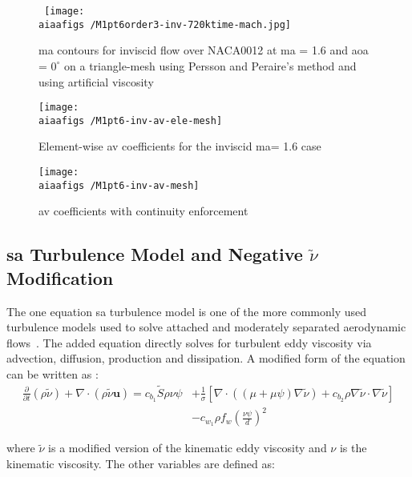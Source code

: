 \begin{figure}[h] \tt
\centering
\texttt{[image: \\aiaafigs /M1pt6order3-inv-720ktime-mach.jpg]} \\
\caption{\gls{ma} contours for inviscid flow over NACA0012 at \gls{ma} = 1.6 and \gls{aoa} = $0^{\circ} $ on a triangle-mesh using Persson and Peraire's method and using artificial viscosity}
\label{fig:inv_mach}
\end{figure}

\begin{figure}
\centering
\begin{minipage}[t]{.55\textwidth}
  \centering
  \texttt{[image: \\aiaafigs /M1pt6-inv-av-ele-mesh]}
  \caption{Element-wise \gls{av} coefficients for the inviscid \gls{ma}= 1.6 case}
  \label{fig:AV-ele}
\end{minipage}%
\begin{minipage}[t]{.55\textwidth}
  \centering
  \texttt{[image: \\aiaafigs /M1pt6-inv-av-mesh]}
  \caption{\gls{av} coefficients with continuity enforcement}
  \label{fig:AV-cont}
\end{minipage}
\end{figure} 

\subsection{\gls{sa} Turbulence Model and Negative $\tilde\nu$ Modification}

The one equation \gls{sa} turbulence model is one of the more commonly used turbulence models used to solve attached and moderately separated aerodynamic flows~\cite{spalart1992one}. The added equation directly solves for turbulent eddy viscosity via advection, diffusion, production and dissipation. A modified form of the equation can be written as \cite{burgess2012robust,oliver2008high,moro2011navier}:
\begin{equation}
\begin{split}
	\frac{\partial}{\partial t}(\rho\tilde\nu) + \nabla\cdot(\rho\tilde\nu\boldsymbol{u}) = c_{b_1}\tilde S \rho\nu\psi &+ \frac{1}{\sigma}\left[\nabla\cdot((\mu + \mu\psi)\nabla\tilde\nu) + c_{b_2}\rho\nabla\tilde\nu\cdot\nabla\tilde\nu\right] \\&- c_{w_1}\rho f_w \left(\frac{\nu\psi}{d}\right)^2
\end{split}
\end{equation}

where $\tilde\nu$ is a modified version of the kinematic eddy viscosity and $\nu$ is the kinematic viscosity. The other variables are defined as:


